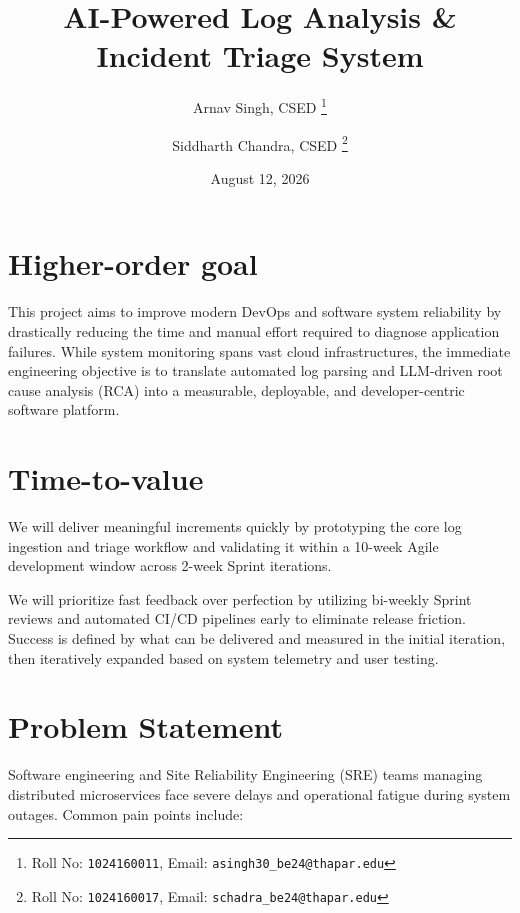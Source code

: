 \documentclass[11pt,a4paper]{article}
\title{AI-Powered Log Analysis \& Incident Triage System}
\author{
Arnav Singh, CSED%
\thanks{Roll No: \texttt{1024160011}, %
Email: \texttt{asingh30\_be24@thapar.edu}}
\and
Siddharth Chandra, CSED%
\thanks{Roll No: \texttt{1024160017}, %
Email: \texttt{schadra\_be24@thapar.edu}}
}
\date{August 12, 2026}
\begin{document}
\maketitle


\section{Higher-order goal}

This project aims to improve modern DevOps and software system reliability by drastically reducing the time and manual effort required to diagnose application failures. While system monitoring spans vast cloud infrastructures, the immediate engineering objective is to translate automated log parsing and LLM-driven root cause analysis (RCA) into a measurable, deployable, and developer-centric software platform.


\section{Time-to-value}

We will deliver meaningful increments quickly by prototyping the core log ingestion and triage workflow and validating it within a 10-week Agile development window across 2-week Sprint iterations.

We will prioritize fast feedback over perfection by utilizing bi-weekly Sprint reviews and automated CI/CD pipelines early to eliminate release friction. Success is defined by what can be delivered and measured in the initial iteration, then iteratively expanded based on system telemetry and user testing.


\section{Problem Statement}

Software engineering and Site Reliability Engineering (SRE) teams managing distributed microservices face severe delays and operational fatigue during system outages. Common pain points include:
\end{document}
